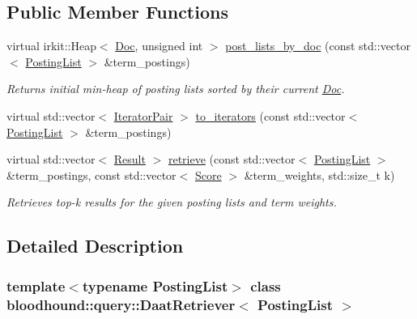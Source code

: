 \subsection*{Public Member Functions}
\begin{DoxyCompactItemize}
\item 
virtual irkit\+::\+Heap$<$ \hyperlink{structbloodhound_1_1Doc}{Doc}, unsigned int $>$ \hyperlink{classbloodhound_1_1query_1_1DaatRetriever_abf9a1012732fe0879d1bf080faf293b6}{post\+\_\+lists\+\_\+by\+\_\+doc} (const std\+::vector$<$ \hyperlink{classbloodhound_1_1PostingList}{Posting\+List} $>$ \&term\+\_\+postings)
\begin{DoxyCompactList}\small\item\em Returns initial min-\/heap of posting lists sorted by their current \hyperlink{structbloodhound_1_1Doc}{Doc}. \end{DoxyCompactList}\item 
virtual std\+::vector$<$ \hyperlink{structbloodhound_1_1query_1_1DaatRetriever_1_1IteratorPair}{Iterator\+Pair} $>$ \hyperlink{classbloodhound_1_1query_1_1DaatRetriever_a5b10288f90a4fc4d89f56971bdc48363}{to\+\_\+iterators} (const std\+::vector$<$ \hyperlink{classbloodhound_1_1PostingList}{Posting\+List} $>$ \&term\+\_\+postings)
\item 
virtual std\+::vector$<$ \hyperlink{structbloodhound_1_1query_1_1Result}{Result} $>$ \hyperlink{classbloodhound_1_1query_1_1DaatRetriever_ab80b4867fc263827dc2fdbe0965a2e8c}{retrieve} (const std\+::vector$<$ \hyperlink{classbloodhound_1_1PostingList}{Posting\+List} $>$ \&term\+\_\+postings, const std\+::vector$<$ \hyperlink{structbloodhound_1_1Score}{Score} $>$ \&term\+\_\+weights, std\+::size\+\_\+t k)
\begin{DoxyCompactList}\small\item\em Retrieves top-\/k results for the given posting lists and term weights. \end{DoxyCompactList}\end{DoxyCompactItemize}


\subsection{Detailed Description}
\subsubsection*{template$<$typename Posting\+List$>$\newline
class bloodhound\+::query\+::\+Daat\+Retriever$<$ Posting\+List $>$}

